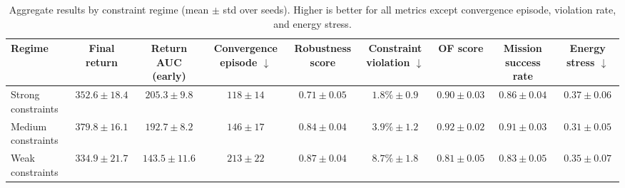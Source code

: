 \documentclass[sigconf]{aamas}
\begin{document}
\begin{table}[h!]
    \caption{Aggregate results by constraint regime (mean $\pm$ std over seeds). Higher is better for all metrics except convergence episode, violation rate, and energy stress.}
    \label{tab:results-control-regimes}
    \centering
    \scriptsize
    \begin{tabularx}{\textwidth}{l c c c c c c c c}
        \toprule
        Regime             & Final return              & Return AUC (early) & Convergence episode $\downarrow$ & Robustness score         & Constraint violation $\downarrow$ & OF score                 & Mission success rate     & Energy stress $\downarrow$ \\
        \midrule
        Strong constraints & $352.6 \pm 18.4$          & $205.3 \pm 9.8$    & $118 \pm 14$                     & $0.71 \pm 0.05$          & $1.8\% \pm 0.9$                   & $0.90 \pm 0.03$          & $0.86 \pm 0.04$          & $0.37 \pm 0.06$            \\
        Medium constraints & $\mathbf{379.8 \pm 16.1}$ & $192.7 \pm 8.2$    & $146 \pm 17$                     & $\mathbf{0.84 \pm 0.04}$ & $3.9\% \pm 1.2$                   & $\mathbf{0.92 \pm 0.02}$ & $\mathbf{0.91 \pm 0.03}$ & $\mathbf{0.31 \pm 0.05}$   \\
        Weak constraints   & $334.9 \pm 21.7$          & $143.5 \pm 11.6$   & $213 \pm 22$                     & $0.87 \pm 0.04$          & $8.7\% \pm 1.8$                   & $0.81 \pm 0.05$          & $0.83 \pm 0.05$          & $0.35 \pm 0.07$            \\
        \bottomrule
    \end{tabularx}
\end{table}
\end{document}
